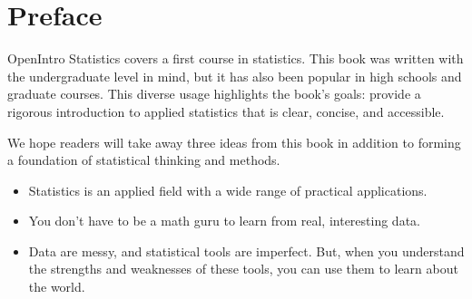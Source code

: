 \chapter*{Preface}

\noindent%
OpenIntro Statistics covers a first course in statistics.
This book was written with the undergraduate level in mind,
but it has also been popular in high schools and graduate courses.
This diverse usage highlights the book's goals:
provide a rigorous introduction to applied statistics
that is clear, concise, and accessible.
\vspace{3mm}

We hope readers will take away three ideas from
this book in addition to forming a foundation of statistical
thinking and methods.\vspace{-1mm}
\begin{itemize}
\setlength{\itemsep}{0mm}
\item
    Statistics is an applied field with a wide range
    of practical applications.
\item
    You don't have to be a math guru to learn
    from real, interesting data.
\item
    Data are messy, and statistical tools are imperfect.
    But, when you understand the strengths and weaknesses of
    these tools, you can use them to learn about the world.
\end{itemize}


%
%
%


